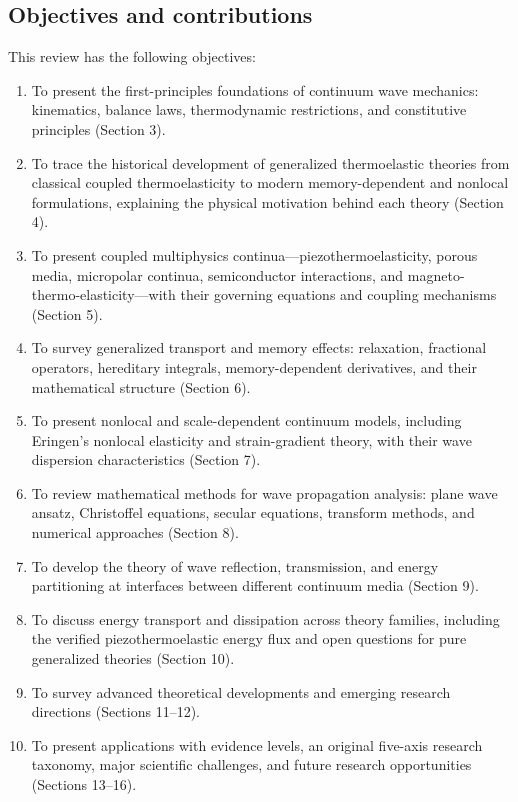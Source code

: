 \subsection{Objectives and contributions}

This review has the following objectives:

\begin{enumerate}
\item To present the first-principles foundations of continuum wave mechanics: kinematics, balance laws, thermodynamic restrictions, and constitutive principles (Section 3).
\item To trace the historical development of generalized thermoelastic theories from classical coupled thermoelasticity to modern memory-dependent and nonlocal formulations, explaining the physical motivation behind each theory (Section 4).
\item To present coupled multiphysics continua—piezothermoelasticity, porous media, micropolar continua, semiconductor interactions, and magneto-thermo-elasticity—with their governing equations and coupling mechanisms (Section 5).
\item To survey generalized transport and memory effects: relaxation, fractional operators, hereditary integrals, memory-dependent derivatives, and their mathematical structure (Section 6).
\item To present nonlocal and scale-dependent continuum models, including Eringen's nonlocal elasticity and strain-gradient theory, with their wave dispersion characteristics (Section 7).
\item To review mathematical methods for wave propagation analysis: plane wave ansatz, Christoffel equations, secular equations, transform methods, and numerical approaches (Section 8).
\item To develop the theory of wave reflection, transmission, and energy partitioning at interfaces between different continuum media (Section 9).
\item To discuss energy transport and dissipation across theory families, including the verified piezothermoelastic energy flux and open questions for pure generalized theories (Section 10).
\item To survey advanced theoretical developments and emerging research directions (Sections 11--12).
\item To present applications with evidence levels, an original five-axis research taxonomy, major scientific challenges, and future research opportunities (Sections 13--16).
\end{enumerate}

